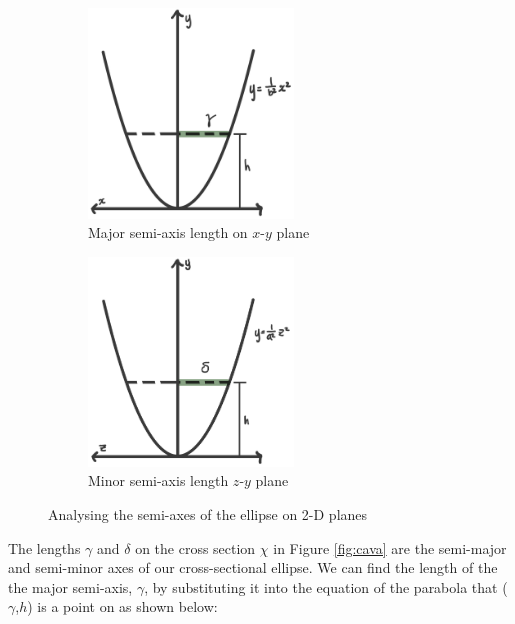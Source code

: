 \documentclass[12pt]{article}
\begin{document}
\begin{figure}[h]
     \centering
     \begin{subfigure}[b]{0.45\textwidth}
         \centering
         \includegraphics[width=0.6\textwidth]{images/gamma.jpg}
         \caption{Major semi-axis length on $x$-$y$ plane}
         \label{fig:xy}
     \end{subfigure}
     \hfill
     \begin{subfigure}[b]{0.45\textwidth}
         \centering
         \includegraphics[width=0.6\textwidth]{images/delta.jpg}
         \caption{Minor semi-axis length $z$-$y$ plane}
         \label{fig:zy}
     \end{subfigure}
     \hfill
        \caption{Analysing the semi-axes of the ellipse on 2-D planes}
        \label{fig:axes}
\end{figure}

The lengths $\gamma$ and $\delta$ on the cross section $\chi$ in Figure \ref{fig:cava} are the semi-major and semi-minor axes of our cross-sectional ellipse. We can find the length of the the major semi-axis, $\gamma$, by substituting it into the equation of the parabola that  ($\gamma$,$h$) is a point on as shown below:
\end{document}
